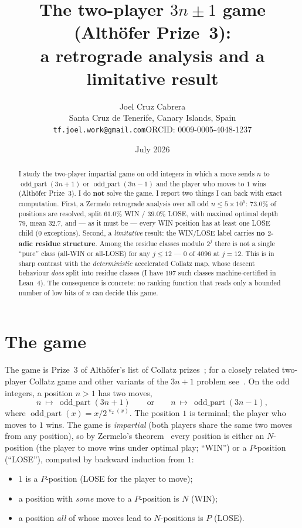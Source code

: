 \documentclass[11pt,a4paper]{article}
\title{\bfseries The two-player $3n\pm1$ game (Alth\"ofer Prize~3):\\
a retrograde analysis and a limitative result}
\author{Joel Cruz Cabrera\\
\small Santa Cruz de Tenerife, Canary Islands, Spain\\
\small\texttt{tf.joel.work@gmail.com}\quad ORCID: 0009-0005-4048-1237}
\date{July 2026}
\theoremstyle{plain}
\theoremstyle{definition}
\newcommand{\op}{\operatorname{odd\_part}}
\newcommand{\val}{\operatorname{v}_2}
\begin{document}
\maketitle

\begin{abstract}
I study the two-player impartial game on odd integers in which a move sends $n$ to
$\op(3n+1)$ or $\op(3n-1)$ and the player who moves to $1$ wins (Alth\"ofer Prize~3). I do
\textbf{not} solve the game. I report two things I can back with exact computation. First, a
Zermelo retrograde analysis over all odd $n\le5\times10^{5}$: $73.0\%$ of positions are
resolved, split $61.0\%$ WIN / $39.0\%$ LOSE, with maximal optimal depth $79$, mean $32.7$,
and --- as it must be --- every WIN position has at least one LOSE child ($0$ exceptions).
Second, a \emph{limitative} result: the WIN/LOSE label carries \textbf{no $2$-adic residue
structure}. Among the residue classes modulo $2^{j}$ there is not a single ``pure'' class
(all-WIN or all-LOSE) for any $j\le12$ --- $0$ of $4096$ at $j=12$. This is in sharp contrast
with the \emph{deterministic} accelerated Collatz map, whose descent behaviour \emph{does}
split into residue classes (I have $197$ such classes machine-certified in Lean~4). The
consequence is concrete: no ranking function that reads only a bounded number of low bits of
$n$ can decide this game.
\end{abstract}

\section{The game}

The game is Prize~3 of Alth\"ofer's list of Collatz prizes~\cite{althofer}; for a closely
related two-player Collatz game and other variants of the $3n+1$ problem
see~\cite{ahz}. On the odd integers, a position $n>1$ has two moves,
\[
  n\ \longmapsto\ \op(3n+1)\qquad\text{or}\qquad n\ \longmapsto\ \op(3n-1),
\]
where $\op(x)=x/2^{\val(x)}$. The position $1$ is terminal; the player who moves to $1$ wins.
The game is \emph{impartial} (both players share the same two moves from any position), so by
Zermelo's theorem~\cite{zermelo} every position is either an $N$-position (the player to move wins under
optimal play; ``WIN'') or a $P$-position (``LOSE''), computed by backward induction from $1$:
\begin{itemize}[nosep]
  \item $1$ is a $P$-position (LOSE for the player to move);
  \item a position with \emph{some} move to a $P$-position is $N$ (WIN);
  \item a position \emph{all} of whose moves lead to $N$-positions is $P$ (LOSE).
\end{itemize}
\end{document}
